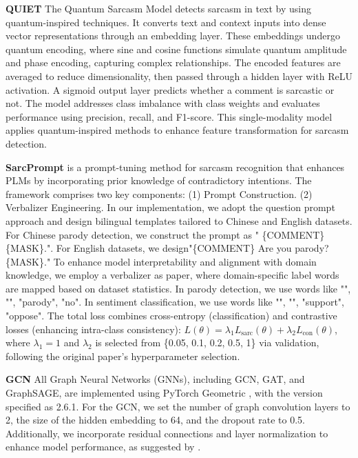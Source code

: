 \textbf{QUIET} \citep{QUIET}
The Quantum Sarcasm Model detects sarcasm in text by using quantum-inspired techniques. It converts text and context inputs into dense vector representations through an embedding layer. These embeddings undergo quantum encoding, where sine and cosine functions simulate quantum amplitude and phase encoding, capturing complex relationships. The encoded features are averaged to reduce dimensionality, then passed through a hidden layer with ReLU activation. A sigmoid output layer predicts whether a comment is sarcastic or not. The model addresses class imbalance with class weights and evaluates performance using precision, recall, and F1-score. This single-modality model applies quantum-inspired methods to enhance feature transformation for sarcasm detection.


\textbf{SarcPrompt} \citep{SarcPrompt}
is a prompt-tuning method for sarcasm recognition that enhances PLMs by incorporating prior knowledge of contradictory intentions. The framework comprises two key components: (1) Prompt Construction. (2) Verbalizer Engineering. In our implementation, we adopt the question prompt approach and design bilingual templates tailored to Chinese and English datasets. For Chinese parody detection, we construct the prompt as " \{COMMENT\}  \{MASK\}.". For English datasets, we design"\{COMMENT\} Are you parody? \{MASK\}." To enhance model interpretability and alignment with domain knowledge, we employ a verbalizer as paper, where domain-specific label words are mapped based on dataset statistics. In parody detection, we use words like "", "", "parody", "no". In sentiment classification, we use words like "", "", "support", "oppose". The total loss combines cross-entropy (classification) and contrastive losses (enhancing intra-class consistency): $L(\theta) = \lambda_1 L_{\text{sarc}}(\theta) + \lambda_2 L_{\text{con}}(\theta)$, where \(\lambda_1 = 1\) and \(\lambda_2\) is selected from \{0.05, 0.1, 0.2, 0.5, 1\} via validation, following the original paper's hyperparameter selection.

\textbf{GCN} \citep{GCN}
All Graph Neural Networks (GNNs), including GCN, GAT, and GraphSAGE, are implemented using PyTorch Geometric \citep{pyg}, with the version specified as 2.6.1. For the GCN, we set the number of graph convolution layers to 2, the size of the hidden embedding to 64, and the dropout rate to 0.5. Additionally, we incorporate residual connections \citep{residual} and layer normalization \citep{layer_norm} to enhance model performance, as suggested by \citet{classic_gnn_strong}.

